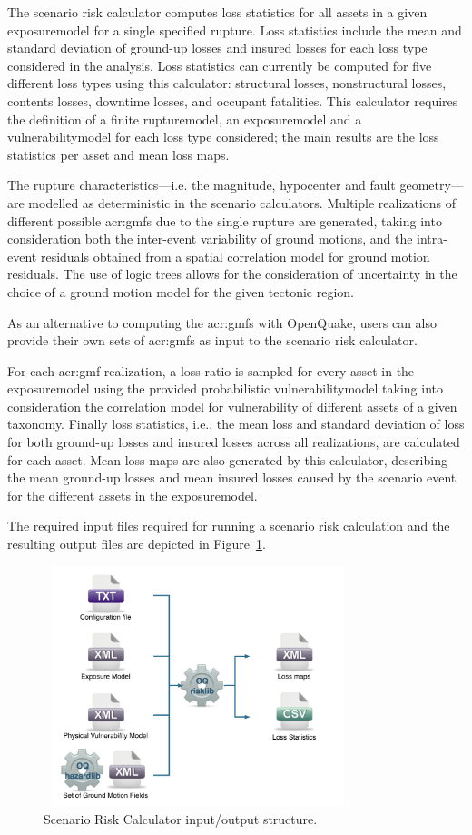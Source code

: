The scenario risk calculator computes loss statistics for all \glspl{asset} in
a given \gls{exposuremodel} for a single specified \gls{rupture}.
Loss statistics include the mean and standard deviation of ground-up losses
and insured losses for each loss type considered in the analysis. Loss
statistics can currently be computed for five different loss types using this
calculator: structural losses, nonstructural losses, contents losses, downtime
losses, and occupant fatalities. This calculator requires the definition of a
finite \gls{rupturemodel}, an \gls{exposuremodel} and a
\gls{vulnerabilitymodel} for each loss type considered; the main results are
the loss statistics per \gls{asset} and mean loss maps.

The \gls{rupture} characteristics---i.e. the magnitude, hypocenter and fault
geometry---are modelled as deterministic in the scenario calculators. Multiple
realizations of different possible \glspl{acr:gmf} due to the single
\gls{rupture} are generated, taking into consideration both the inter-event
variability of ground motions, and the intra-event residuals obtained from a
spatial correlation model for ground motion residuals. The use of logic trees
allows for the consideration of uncertainty in the choice of a ground motion
model for the given tectonic region.

As an alternative to computing the \glspl{acr:gmf} with OpenQuake, users can
also provide their own sets of \glspl{acr:gmf} as input to the scenario risk
calculator.

For each \gls{acr:gmf} realization, a loss ratio is sampled for every asset in
the \gls{exposuremodel} using the provided probabilistic
\gls{vulnerabilitymodel} taking into consideration the correlation model for
vulnerability of different \glspl{asset} of a given taxonomy. Finally loss
statistics, i.e., the mean loss and standard deviation of loss for both
ground-up losses and insured losses across all realizations, are calculated
for each \gls{asset}. Mean loss maps are also generated by this calculator,
describing the mean ground-up losses and mean insured losses caused by the
scenario event for the different assets in the \gls{exposuremodel}.

The required input files required for running a scenario risk calculation and
the resulting output files are depicted in Figure~\ref{fig:io-structure-scenario-risk}.

\begin{figure}[ht]
\centering
\includegraphics[width=9cm,height=7cm]{figures/risk/io-structure-scenario-risk.pdf}
\caption{Scenario Risk Calculator input/output structure.}
\label{fig:io-structure-scenario-risk}
\end{figure}